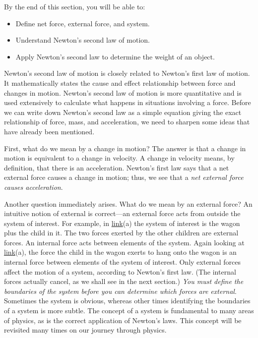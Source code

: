 \documentclass[
]{book}
\providecommand{\tightlist}{%
  \setlength{\itemsep}{0pt}\setlength{\parskip}{0pt}}
\begin{document}
By the end of this section, you will be able to:

\begin{itemize}
\tightlist
\item
  Define net force, external force, and system.
\item
  Understand Newton's second law of motion.
\item
  Apply Newton's second law to determine the weight of an object.
\end{itemize}

\protect\hypertarget{import-auto-id765465}{}{Newton's second law of motion}
is closely related to Newton's first law of motion. It mathematically
states the cause and effect relationship between force and changes in
motion. Newton's second law of motion is more quantitative and is used
extensively to calculate what happens in situations involving a force.
Before we can write down Newton's second law as a simple equation giving
the exact relationship of force, mass, and acceleration, we need to
sharpen some ideas that have already been mentioned.

First, what do we mean by a change in motion? The answer is that a
change in motion is equivalent to a change in velocity. A change in
velocity means, by definition, that there is an
\protect\hypertarget{import-auto-id3190786}{}{acceleration}. Newton's first
law says that a net external force causes a change in motion; thus, we
see that a \emph{net external force causes acceleration}.

Another question immediately arises. What do we mean by an external
force? An intuitive notion of external is correct---an \protect\hypertarget{import-auto-id3026856}{}{external
force} acts from outside the
{system} of interest. For example, in
\protect\hyperlink{import-auto-id1993910}{link}(a) the system of
interest is the wagon plus the child in it. The two forces exerted by
the other children are external forces. An internal force acts between
elements of the system. Again looking at
\protect\hyperlink{import-auto-id1993910}{link}(a), the force the
child in the wagon exerts to hang onto the wagon is an internal force
between elements of the system of interest. Only external forces affect
the motion of a system, according to Newton's first law. (The internal
forces actually cancel, as we shall see in the next section.) \emph{You must
define the boundaries of the system before you can determine which
forces are external}. Sometimes the system is obvious, whereas other
times identifying the boundaries of a system is more subtle. The concept
of a system is fundamental to many areas of physics, as is the correct
application of Newton's laws. This concept will be revisited many times
on our journey through physics.
\end{document}
